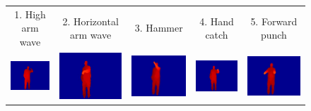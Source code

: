 \documentclass[final,3p,times,twocolumn]{elsarticle}
\begin{document}
\begin{figure}[ht]
{\begin{tabular}{ccccc}
			1. High arm wave &          2. Horizontal arm wave &          3. Hammer &          4. Hand catch &          5. Forward punch\\
			
			\includegraphics[width=0.4\columnwidth]{Figures/MSRAction3D_highthrow.pdf} &          \includegraphics[width=0.4\columnwidth]{Figures/MSRAction3D_drawx.pdf} &          \includegraphics[width=0.4\columnwidth]{Figures/MSRAction3D_drawtick.pdf} &          \includegraphics[width=0.4\columnwidth]{Figures/MSRAction3D_drawcircle.pdf} &          \includegraphics[width=0.4\columnwidth]{Figures/MSRAction3D_handclap.pdf} \\
			

\end{tabular}}
\end{figure}
\end{document}
